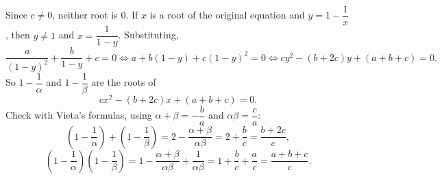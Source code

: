 Since $c\ne0$, neither root is $0$. If $x$ is a root of the original equation and $y=1-\dfrac1x$, then $y\ne1$ and $x=\dfrac{1}{1-y}$. Substituting,
\[\dfrac{a}{(1-y)^2}+\dfrac{b}{1-y}+c=0\iff a+b(1-y)+c(1-y)^2=0\iff cy^2-(b+2c)y+(a+b+c)=0.\]
So $1-\dfrac1\alpha$ and $1-\dfrac1\beta$ are the roots of
\[\boxed{cx^2-(b+2c)x+(a+b+c)=0}.\]
Check with Vieta's formulas, using $\alpha+\beta=-\dfrac ba$ and $\alpha\beta=\dfrac ca$:
\[\left(1-\dfrac1\alpha\right)+\left(1-\dfrac1\beta\right)=2-\dfrac{\alpha+\beta}{\alpha\beta}=2+\dfrac bc=\dfrac{b+2c}{c},\]
\[\left(1-\dfrac1\alpha\right)\left(1-\dfrac1\beta\right)=1-\dfrac{\alpha+\beta}{\alpha\beta}+\dfrac{1}{\alpha\beta}=1+\dfrac bc+\dfrac ac=\dfrac{a+b+c}{c}.\]
